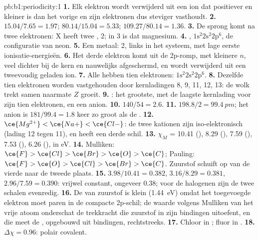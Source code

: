 \begin{solution}{pb:b1:periodicity:1}
\textbf{1.} Elk elektron wordt verwijderd uit een ion dat positiever en
kleiner is dan het vorige en zijn elektronen dus steviger vasthoudt.
\textbf{2.} $15.04/7.65 = 1.97$; $80.14/15.04 = 5.33$; $109.27/80.14 = 1.36$.
\textbf{3.} De sprong komt na twee elektronen: X heeft twee
,  2; in  3 is dat magnesium.
\textbf{4.} , $1\text{s}^2 2\text{s}^2 2\text{p}^6$, de
configuratie van neon.
\textbf{5.} Een metaal:  2, links in het systeem, met lage eerste
ionisatie-energieën.
\textbf{6.} Het derde elektron komt uit de 2p-romp, met kleinere $n$,
veel dichter bij de kern en nauwelijks afgeschermd, en wordt verwijderd
uit een tweevoudig geladen ion.
\textbf{7.} Alle hebben tien elektronen: $1\text{s}^2 2\text{s}^2 2\text{p}^6$.
\textbf{8.} Dezelfde tien elektronen worden vastgehouden door kernladingen
8, 9, 11, 12, 13: de wolk trekt samen naarmate $Z$ groeit.
\textbf{9.} : het grootste, met de laagste kernlading voor zijn
tien elektronen, en een anion.
\textbf{10.} $140/54 = 2.6$.
\textbf{11.} $198.8/2 = \qty{99.4}{pm}$; het anion is $181/99.4 = 1.8$
keer zo groot als de .
\textbf{12.} $\ce{Mg^{2+}} < \ce{Na+} < \ce{Cl-}$: de twee kationen zijn
iso-elektronisch (lading 12 tegen 11), en  heeft een derde schil.
\textbf{13.} $\chi_M$ = 10.41 (), 8.29 (), 7.59 (),
7.53 (), 6.26 (), in eV.
\textbf{14.} Mulliken: $\ce{F} > \ce{Cl} > \ce{Br} > \ce{O} > \ce{C}$;
Pauling: $\ce{F} > \ce{O} > \ce{Cl} > \ce{Br} > \ce{C}$. Zuurstof schuift
op van de vierde naar de tweede plaats.
\textbf{15.} $3.98/10.41 = 0.382$, $3.16/8.29 = 0.381$, $2.96/7.59 =
0.390$: vrijwel constant, ongeveer 0.38; voor de halogenen zijn de twee
schalen evenredig.
\textbf{16.} De  van zuurstof is klein
(\qty{1.44}{eV}) omdat het toegevoegde elektron moet paren in de compacte
2p-schil; de waarde volgens Mulliken van het vrije atoom onderschat de
trekkracht die zuurstof in zijn bindingen uitoefent, en die meet de
, opgebouwd uit bindingen, rechtstreeks.
\textbf{17.} Chloor in ; fluor in .
\textbf{18.} $\Delta\chi = 0.96$: polair covalent.

\end{solution}
